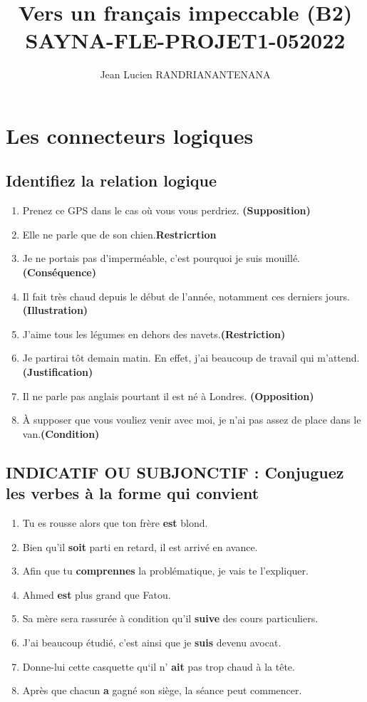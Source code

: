 \documentclass[12pt]{article}
\author{Jean Lucien RANDRIANANTENANA}
\title{Vers un français
impeccable (B2)\\SAYNA-FLE-PROJET1-052022}
\newcommand{\colo}[1]{{\color{blue}\textbf{#1}}}
\begin{document}
\maketitle
\tableofcontents
\newpage
\section{Les connecteurs logiques}
\subsection{Identifiez la relation logique}
\begin{enumerate}
	\item Prenez ce GPS dans le cas où vous vous perdriez. \colo{(Supposition)}
	\item Elle ne parle que de son chien.\colo{Restricrtion}
	\item Je ne portais pas d’imperméable, c'est pourquoi je suis mouillé. \colo{(Conséquence)}
	\item Il fait très chaud depuis le début de l’année, notamment ces derniers jours. \colo{(Illustration)}
	\item J'aime tous les légumes en dehors des navets.\colo{(Restriction)}
	\item Je partirai tôt demain matin. En effet, j'ai beaucoup de travail qui m’attend. \colo{(Justification)}
	\item Il ne parle pas anglais pourtant il est né à Londres. \colo{(Opposition)}
	\item À supposer que vous vouliez venir avec moi, je n'ai pas assez de place dans le van.\colo{(Condition)}
\end{enumerate}
\subsection{INDICATIF OU SUBJONCTIF : Conjuguez les verbes à la forme qui convient}
\begin{enumerate}
	\item Tu es rousse alors que ton frère \colo{est} blond.
	\item Bien qu’il \colo{soit} parti en retard, il est arrivé en avance.
	\item Afin que tu \colo{comprennes} la problématique, je vais te l’expliquer. 
	\item Ahmed \colo{est} plus grand que Fatou.
	\item Sa mère sera rassurée à condition qu'il \colo{suive} des cours particuliers.
	\item J’ai beaucoup étudié, c’est ainsi que je \colo{suis} devenu avocat.
	\item Donne-lui cette casquette qu‘il n’ \colo{ait} pas trop chaud à la tête.
	\item Après que chacun \colo{a} gagné son siège, la séance peut commencer.
\end{enumerate}
\end{document}
